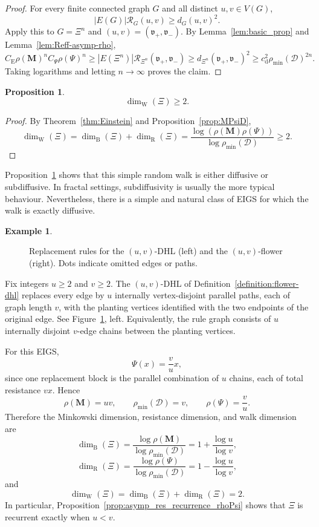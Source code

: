 \documentclass{article}
\DeclareRobustCommand{\revision}[1]{{\color{red}#1}}
\theoremstyle{plain}
\theoremstyle{definition}
\newtheorem{example}[theorem]{Example}
\newtheorem{proposition}[theorem]{Proposition}
\newcommand{\dist}{\mathrm{d}}
\newcommand{\Reff}{\mathscr{R}}
\newcommand{\dimbox}{\dim_\mathrm{B}}
\newcommand{\dimwalk}{\dim_\mathrm{W}}
\newcommand{\dimresis}{\dim_\mathrm{R}}
\begin{document}
\begin{proof}
For every finite connected graph $G$ and all distinct $u,v\in V(G)$,
\[
|E(G)|\Reff_G(u,v)\ge d_G(u,v)^2.
\]
Apply this to $G=\Xi^n$ and $(u,v)=(\mathfrak v_+,\mathfrak v_-)$.
By Lemma~\ref{lem:basic_prop} and Lemma~\ref{lem:Reff-asymp-rho},
\[
C_{\mathrm E}\rho(\mathbf M)^n C_{\Psi}\rho(\Psi)^n
\ge
|E(\Xi^n)|\Reff_{\Xi^n}(\mathfrak v_+,\mathfrak v_-)
\ge
d_{\Xi^n}(\mathfrak v_+,\mathfrak v_-)^2
\ge
c_{\dist}^2 \rho_{\min}(\mathcal D)^{2n}.
\]
Taking logarithms and letting $n\to\infty$ proves the claim.
\end{proof}

\begin{proposition}\label{prop:walk_dimension_ge_2}
\[
\dimwalk(\Xi)\ge 2.
\]
\end{proposition}

\begin{proof}
By Theorem~\ref{thm:Einstein} and Proposition~\ref{prop:MPsiD},
\[
\dimwalk(\Xi)
=
\dimbox(\Xi)+\dimresis(\Xi)
=
\frac{\log(\rho(\mathbf M)\rho(\Psi))}{\log \rho_{\min}(\mathcal D)}
\ge 2.
\]
\end{proof}

Proposition~\ref{prop:walk_dimension_ge_2} shows that this simple random walk is either diffusive or subdiffusive.
In fractal settings, subdiffusivity is usually the more typical behaviour.
Nevertheless, there is a simple and natural class of EIGS for which the walk is exactly diffusive.

\begin{example}\label{ex:uvDHL}
\begin{figure}[t]
\centering

\caption{\revision{Replacement rules for the $(u,v)$-DHL (left) and the $(u,v)$-flower (right). Dots indicate omitted edges or paths.}}
\label{fig:uvDHL}
\end{figure}

Fix integers $u\ge 2$ and $v\ge 2$.
\revision{The $(u,v)$-DHL of Definition~\ref{definition:flower-dhl} replaces every edge by $u$ internally vertex-disjoint parallel paths, each of graph length $v$, with the planting vertices identified with the two endpoints of the original edge.}
\revision{See Figure~\ref{fig:uvDHL}, left.}
Equivalently, the rule graph consists of $u$ internally disjoint $v$-edge chains between the planting vertices.

For this EIGS,
\[
\Psi(x)=\frac{v}{u}x,
\]
since one replacement block is the parallel combination of $u$ chains, each of total resistance $vx$.
Hence
\[
\rho(\mathbf M)=uv,
\qquad
\rho_{\min}(\mathcal D)=v,
\qquad
\rho(\Psi)=\frac{v}{u}.
\]
Therefore the Minkowski dimension, resistance dimension, and walk dimension are
\[
\dimbox(\Xi)
=
\frac{\log\rho(\mathbf M)}{\log \rho_{\min}(\mathcal D)}
=
1+\frac{\log u}{\log v},
\]
\[
\dimresis(\Xi)
=
\frac{\log \rho(\Psi)}{\log \rho_{\min}(\mathcal D)}
=
1-\frac{\log u}{\log v},
\]
and
\[
\dimwalk(\Xi)
=
\dimbox(\Xi)+\dimresis(\Xi)
=
2.
\]
In particular, Proposition~\ref{prop:asymp_res_recurrence_rhoPsi} shows that $\Xi$ is recurrent exactly when $u<v$.
\end{example}
\end{document}

